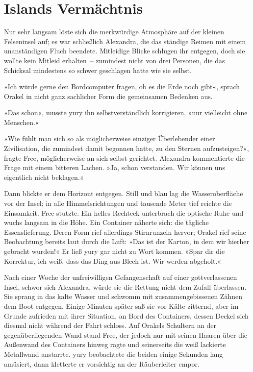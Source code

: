 \chapter{Islands Vermächtnis}

Nur sehr langsam löste sich die merkwürdige Atmosphäre auf der kleinen Felseninsel auf; es war schließlich Alexandra, die das ständige Reimen mit einem unanständigen Fluch beendete. Mitleidige Blicke schlugen ihr entgegen, doch sie wollte kein Mitleid erhalten~– zumindest nicht von drei Personen, die das Schicksal mindestens so schwer geschlagen hatte wie sie selbst.

»Ich würde gerne den Bordcomputer fragen, ob es die Erde noch gibt«, sprach Orakel in nicht ganz sachlicher Form die gemeinsamen Bedenken aus.

»Das schon«, musste yury ihn selbstverständlich korrigieren, »nur vielleicht ohne Menschen.«

»Wie fühlt man sich so als möglicherweise einziger Überlebender einer Zivilisation, die zumindest damit begonnen hatte, zu den Sternen aufzusteigen?«, fragte Free, möglicherweise an sich selbst gerichtet. Alexandra kommentierte die Frage mit einem bitteren Lachen. »Ja, schon verstanden. Wir können uns eigentlich nicht beklagen.«

Dann blickte er dem Horizont entgegen. Still und blau lag die Wasseroberfläche vor der Insel; in alle Himmelsrichtungen und tausende Meter tief reichte die Einsamkeit. Free stutzte. Ein helles Rechteck unterbrach die optische Ruhe und wuchs langsam in die Höhe. Ein Container näherte sich: die tägliche Essenslieferung. Deren Form rief allerdings Stirnrunzeln hervor; Orakel rief seine Beobachtung bereits laut durch die Luft: »Das ist der Karton, in dem wir hierher gebracht wurden!« Er ließ yury gar nicht zu Wort kommen. »Spar dir die Korrektur, ich weiß, dass das Ding aus Blech ist. Wir werden abgeholt.«

Nach einer Woche der unfreiwilligen Gefangenschaft auf einer gottverlassenen Insel, schwor sich Alexandra, würde sie die Rettung nicht dem Zufall überlassen. Sie sprang in das kalte Wasser und schwomm mit zusammengebissenen Zähnen dem Boot entgegen. Einige Minuten später saß sie vor Kälte zitternd, aber im Grunde zufrieden mit ihrer Situation, an Bord des Containers, dessen Deckel sich diesmal nicht während der Fahrt schloss. Auf Orakels Schultern an der gegenüberliegenden Wand stand Free, der jedoch nur mit seinen Haaren über die Außenwand des Containers hinweg ragte und seinerseits die weiß lackierte Metallwand anstarrte. yury beobachtete die beiden einige Sekunden lang amüsiert, dann kletterte er vorsichtig an der Räuberleiter empor.

